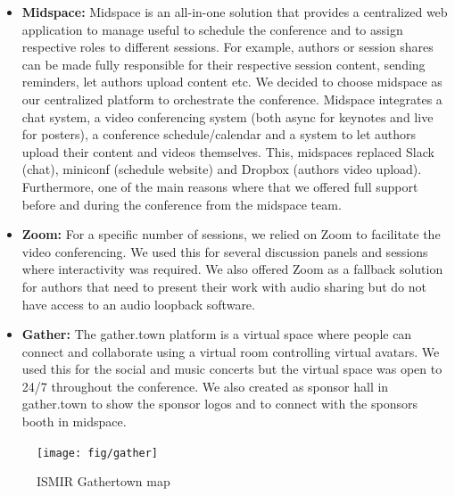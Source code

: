 \documentclass[%
10pt,								%
titlepage,						%
]
{scrartcl}
\begin{document}
\begin{itemize}
    \item \textbf{Midspace:} Midspace is an all-in-one solution that provides a centralized web application to manage useful to schedule the conference and to assign respective roles to different sessions. For example, authors or session shares can be made fully responsible for their respective session content, sending reminders, let authors upload content etc. We decided to choose midspace as our centralized platform to orchestrate the conference. Midspace integrates a chat system, a video conferencing system (both async for keynotes and live for posters), a conference schedule/calendar and a system to let authors upload their content and videos themselves. This, midspaces replaced Slack (chat), miniconf (schedule website) and Dropbox (authors video upload). Furthermore, one of the main reasons where that we offered full support before and during the conference from the midspace team. 
    \item \textbf{Zoom:} For a specific number of sessions, we relied on Zoom to facilitate the video conferencing. We used this for several discussion panels and sessions where interactivity was required. We also offered Zoom as a fallback solution for authors that need to present their work with audio sharing but do not have access to an audio loopback software.
    \item \textbf{Gather:} The gather.town platform is a virtual space where people can connect and collaborate using a virtual room controlling virtual avatars. We used this for the social and music concerts but the virtual space was open to 24/7 throughout the conference. We also created as sponsor hall in gather.town to show the sponsor logos and to connect with the sponsors booth in midspace.
\end{itemize}

\begin{figure}%
    \centering
    \texttt{[image: fig/gather]}%
    \caption{ISMIR Gathertown map}%
    \label{fig:gather}%
\end{figure}
\end{document}
